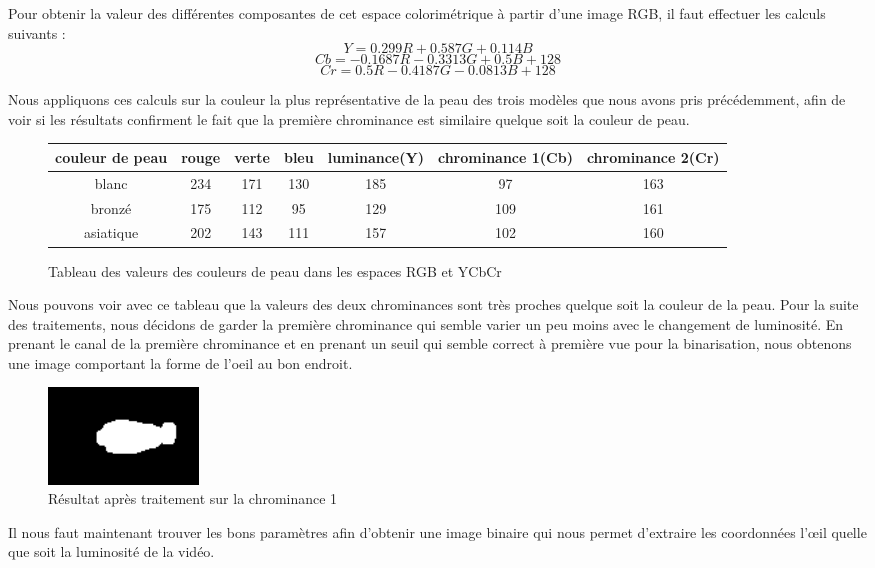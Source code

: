 Pour obtenir la valeur des différentes composantes de cet espace colorimétrique à partir
d'une image RGB, il faut effectuer les calculs suivants :
$$Y = 0.299R + 0.587 G + 0.114 B$$
$$Cb = -0.1687R - 0.3313 G + 0.5B + 128$$
$$Cr = 0.5R -0.4187G -0.0813B + 128$$

Nous appliquons ces calculs sur la couleur la plus représentative de la peau des trois modèles
que nous avons pris précédemment, afin de voir si les résultats confirment le fait que la première
chrominance est similaire quelque soit la couleur de peau.

\begin{figure}[H]
 \begin{tabular}{|c|c|c|c|c|c|c|}
  \hline
  couleur de peau & rouge & verte & bleu & luminance(Y) & chrominance 1(Cb) & chrominance 2(Cr)\\
  \hline
  blanc & 234 & 171 & 130 & 185 & 97 & 163 \\
  \hline
  bronzé & 175 & 112 & 95 & 129 & 109 & 161 \\
  \hline
  asiatique & 202 & 143 & 111 & 157 & 102 & 160\\
  \hline
 \end{tabular}
 \caption{Tableau des valeurs des couleurs de peau dans les espaces RGB et YCbCr}
\end{figure}

Nous pouvons voir avec ce tableau que la valeurs des deux chrominances sont très proches quelque soit
la couleur de la peau. Pour la suite des traitements, nous décidons de garder la première chrominance qui semble
varier un peu moins avec le changement de luminosité. En prenant le canal de la première chrominance et en 
prenant un seuil qui semble correct à première vue pour la binarisation, nous obtenons une image comportant la forme de l'oeil au bon endroit.

\begin{figure}[H]
 \center
 \includegraphics[width=4cm]{image/result_yuv.png}
 \caption{Résultat après traitement sur la chrominance 1}
\end{figure}

Il nous faut maintenant trouver les bons paramètres afin d'obtenir une image binaire qui nous permet d'extraire les 
coordonnées l'œil quelle que soit la luminosité de la vidéo.

